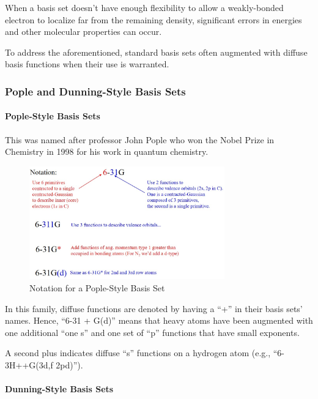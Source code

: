 \documentclass[
  letterpaper,
  DIV=11,
  numbers=noendperiod]{scrreprt}
\let\oldparagraph\paragraph
\renewcommand{\paragraph}[1]{\oldparagraph{#1}\mbox{}}
\begin{document}
When a basis set doesn't have enough flexibility to allow a
weakly-bonded electron to localize far from the remaining density,
significant errors in energies and other molecular properties can occur.

To address the aforementioned, standard basis sets often augmented with
diffuse basis functions when their use is warranted.

\hypertarget{pople-and-dunning-style-basis-sets}{%
\subsubsection{Pople and Dunning-Style Basis
Sets}\label{pople-and-dunning-style-basis-sets}}

\hypertarget{pople-style-basis-sets}{%
\paragraph{Pople-Style Basis Sets}\label{pople-style-basis-sets}}

This was named after professor John Pople who won the Nobel Prize in
Chemistry in 1998 for his work in quantum chemistry.

\begin{figure}

{\centering \includegraphics[width=3.32in,height=\textheight]{./images/wk2a/pople.jpg}

}

\caption{Notation for a Pople-Style Basis Set}

\end{figure}

In this family, diffuse functions are denoted by having a ``+'' in their
basis sets' names. Hence, ``6-31 + G(d)'' means that heavy atoms have
been augmented with one additional ``one s'' and one set of ``p''
functions that have small exponents.

A second plus indicates diffuse ``s'' functions on a hydrogen atom
(e.g., ``6-3H++G(3d,f 2pd)'').

\hypertarget{dunning-style-basis-sets}{%
\paragraph{Dunning-Style Basis Sets}\label{dunning-style-basis-sets}}
\end{document}
